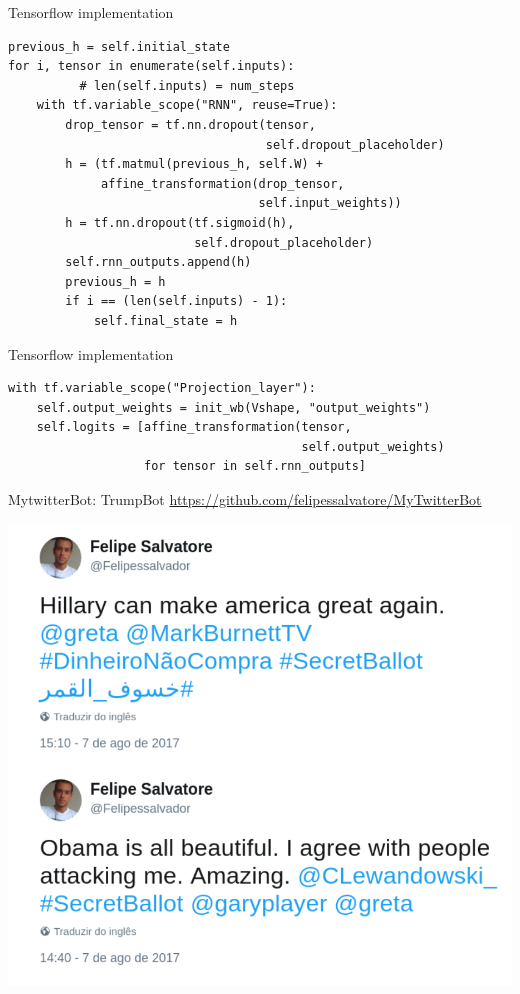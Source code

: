\documentclass[10pt]{beamer}
\begin{document}
\begin{frame}[fragile]{Tensorflow implementation}
\begin{verbatim}
previous_h = self.initial_state
for i, tensor in enumerate(self.inputs):
          # len(self.inputs) = num_steps
    with tf.variable_scope("RNN", reuse=True):
        drop_tensor = tf.nn.dropout(tensor,
                                    self.dropout_placeholder)
        h = (tf.matmul(previous_h, self.W) +
             affine_transformation(drop_tensor,
                                   self.input_weights))
        h = tf.nn.dropout(tf.sigmoid(h),
                          self.dropout_placeholder)
        self.rnn_outputs.append(h)
        previous_h = h
        if i == (len(self.inputs) - 1):
            self.final_state = h
\end{verbatim}
\end{frame}

\begin{frame}[fragile]{Tensorflow implementation}
\begin{verbatim}
with tf.variable_scope("Projection_layer"):
    self.output_weights = init_wb(Vshape, "output_weights")
    self.logits = [affine_transformation(tensor,
                                         self.output_weights)
                   for tensor in self.rnn_outputs]
\end{verbatim}
\end{frame}

\begin{frame}{MytwitterBot: TrumpBot}
\url{https://github.com/felipessalvatore/MyTwitterBot}
\begin{center}
\includegraphics[scale=0.24]{images/TrumpBot.png}
\end{center}
\end{frame}
\end{document}
